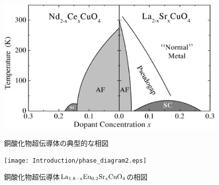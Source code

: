 \begin{figure}[!h]
 \begin{minipage}{0.55\hsize}
    \begin{center}
   \includegraphics[width=\hsize]{Introduction/phase_diagram.eps}
  \end{center}
  \caption{銅酸化物超伝導体の典型的な相図\cite{Andrea2003}}
  \label{fig:phase_diagram}
 \end{minipage}
 \begin{minipage}{0.45\hsize}
    \begin{center}
   \texttt{[image: Introduction/phase\_diagram2.eps]}
  \end{center}
  \caption{銅酸化物超伝導体$\rm La_{1.8-x}Eu_{0.2}Sr_{x}CuO_4$の相図\cite{Cavalleri2018}}
  \label{fig:phase_diagram2}
 \end{minipage}
\end{figure}

